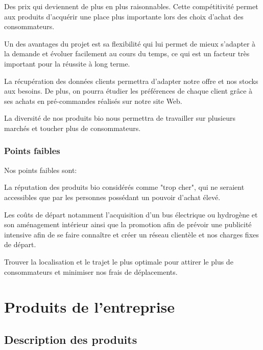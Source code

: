\documentclass[12pt,a4paper]{report}
\begin{document}
Des prix qui deviennent de plus en plus raisonnables. Cette compétitivité permet aux produits d'acquérir une place plus importante lors des choix d'achat des consommateurs.

Un des avantages du projet est sa flexibilité qui lui permet de mieux s’adapter à la demande et évoluer facilement au cours du temps, ce qui est un facteur très important pour la réussite à long terme. 

La récupération des données clients permettra d'adapter notre offre et nos stocks aux besoins. De plus, on pourra étudier les préférences de chaque client grâce à ses achats en pré-commandes réalisés sur notre site Web. 

La diversité de nos produits bio nous permettra de travailler sur plusieurs marchés et toucher plus de consommateurs.

\subsection{Points faibles }

Nos points faibles sont:

La réputation des produits bio considérés comme "trop cher", qui ne seraient accessibles que par les personnes possédant un pouvoir d’achat élevé. 

Les coûts de départ notamment l'acquisition d'un bus électrique ou hydrogène et son aménagement intérieur ainsi que la promotion afin de prévoir une publicité intensive afin de se faire connaître et créer un réseau clientèle et nos charges fixes de départ. 

Trouver la localisation et le trajet le plus optimale pour attirer le plus de consommateurs et minimiser nos frais de déplacements. 

	
	
			
	\chapter{Produits de l'entreprise}
		\newpage
		\section{Description des produits}
		
\end{document}
